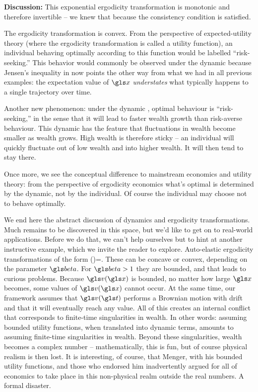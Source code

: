 {\bf Discussion:} 
This exponential ergodicity transformation is monotonic and 
therefore invertible -- we knew that because the consistency condition is satisfied. 

The ergodicity transformation is convex. From the 
perspective of expected-utility theory (where the ergodicity transformation is called a utility function),
an individual behaving optimally according to 
this function would be labelled ``risk-seeking.'' This behavior would commonly be observed
under the dynamic  because Jensen's inequality 
in  now points the other way from what we had in all previous examples: 
the expectation value of $\x$ {\it understates} 
what typically happens to a single trajectory over time.


Another new phenomenon: 
under the dynamic , optimal behaviour is ``risk-seeking,'' 
in the sense that it will lead to faster wealth growth than risk-averse behaviour. 
This dynamic has the feature that fluctuations in wealth become smaller 
as wealth grows. High wealth is therefore sticky -- an individual will quickly fluctuate out of 
low wealth and into higher wealth. It will then tend to stay there. 

Once more, we see the conceptual difference to mainstream economics and utility theory:
from the perspective of ergodicity economics what's optimal is determined by the dynamic, 
not by the individual. Of course the individual may choose not to behave optimally. 

We end here the abstract discussion of dynamics and ergodicity transformations. Much remains to be discovered
in this space, but we'd like to get on to real-world applications. Before we do that, we 
can't help ourselves but to hint at another instructive example, which we invite the 
reader to explore. Auto-elastic ergodicity transformations of the form
\be
\gv(\x)=.
\ee
These can be concave or convex, depending on the parameter $\gbeta$. For $\gbeta>1$
they are bounded, and that leads to curious problems. Because $\gv(\x)$ is bounded, 
no matter how large $\x$ becomes, some values of $\gv(\x)$ cannot occur. 
At the same time, our framework assumes that $\gv(\t)$
performs a Brownian motion with drift and that it will eventually reach any value. 
All of this creates an internal conflict that corresponds
to finite-time singularities in wealth. In other words: assuming bounded utility functions, 
when translated into dynamic terms, amounts to assuming finite-time singularities in wealth.
Beyond these singularities, wealth becomes a complex number -- mathematically, this is
fun, but of course physical realism is then lost. It is interesting, of course, that 
Menger, with his bounded utility functions, and those who endorsed him inadvertently 
argued for all of economics to take place in this non-physical realm outside the real 
numbers. A formal disaster.

